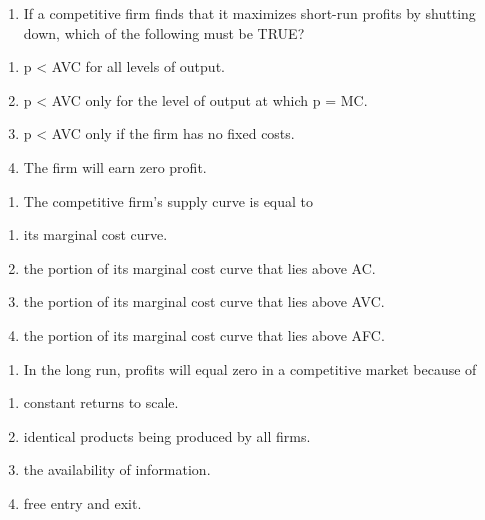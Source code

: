 \documentclass[11pt,]{article}
\providecommand{\tightlist}{%
  \setlength{\itemsep}{0pt}\setlength{\parskip}{0pt}}
\begin{document}
\begin{enumerate}
\def\labelenumi{\arabic{enumi})}
\setcounter{enumi}{16}
\tightlist
\item
  If a competitive firm finds that it maximizes short-run profits by
  shutting down, which of the following must be TRUE?
\end{enumerate}

\begin{enumerate}
\def\labelenumi{\Alph{enumi})}
\tightlist
\item
  p \textless{} AVC for all levels of output.
\item
  p \textless{} AVC only for the level of output at which p = MC.
\item
  p \textless{} AVC only if the firm has no fixed costs.
\item
  The firm will earn zero profit.
\end{enumerate}

\begin{enumerate}
\def\labelenumi{\arabic{enumi})}
\setcounter{enumi}{17}
\tightlist
\item
  The competitive firm's supply curve is equal to
\end{enumerate}

\begin{enumerate}
\def\labelenumi{\Alph{enumi})}
\tightlist
\item
  its marginal cost curve.
\item
  the portion of its marginal cost curve that lies above AC.
\item
  the portion of its marginal cost curve that lies above AVC.
\item
  the portion of its marginal cost curve that lies above AFC.
\end{enumerate}

\begin{enumerate}
\def\labelenumi{\arabic{enumi})}
\setcounter{enumi}{18}
\tightlist
\item
  In the long run, profits will equal zero in a competitive market
  because of
\end{enumerate}

\begin{enumerate}
\def\labelenumi{\Alph{enumi})}
\tightlist
\item
  constant returns to scale.
\item
  identical products being produced by all firms.
\item
  the availability of information.
\item
  free entry and exit.
\end{enumerate}
\end{document}
